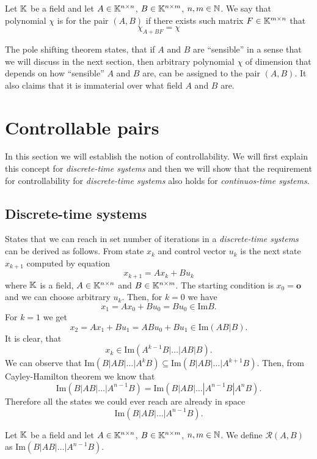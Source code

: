 \begin{definition}
    Let $\mathbb{K}$ be a field and let $A \in \mathbb{K}^{n \times n}$, $B \in \mathbb{K}^{n \times m}$, $n,m \in \mathbb{N}$. We say that polynomial $\chi$ is  for the pair $(A,B)$ if there exists such matrix $F\in\mathbb{K}^{m \times n}$ that $$\chi_{A+BF}=\chi$$
\end{definition}

The pole shifting theorem states, that if $A$ and $B$ are ``sensible'' in a sense that we will discuss in the next section, then arbitrary polynomial $\chi$ of dimension that depends on how ``sensible'' $A$ and $B$ are, can be assigned to the pair $(A,B)$. It also claims that it is immaterial over what field $A$ and $B$ are.

\section{Controllable pairs}

In this section we will establish the notion of controllability. We will first explain this concept for \textit{discrete-time systems} and then we will show that the requirement for controllability for \textit{discrete-time systems} also holds for \textit{continuos-time systems}.

\subsection{Discrete-time systems}

States that we can reach in set number of iterations in a \textit{discrete-time systems} can be derived as follows. From state $x_k$ and control vector $u_k$ is the next state $x_{k+1}$ computed by equation $$x_{k+1}=Ax_k+Bu_k$$ where $\mathbb{K}$ is a field, $A\in\mathbb{K}^{n\times n}$ and $B\in\mathbb{K}^{n\times m}$. The starting condition is $x_0=\textbf{o}$ and we can choose arbitrary $u_k$. Then, for $k=0$ we have $$x_1=Ax_0+Bu_0=Bu_0 \in \text{Im}B.$$ For $k=1$ we get $$x_2=Ax_1+Bu_1=ABu_0+Bu_1\in\text{Im}(AB|B).$$ It is clear, that $$x_k\in\text{Im}(A^{k-1}B|\ldots|AB|B).$$ We can observe that $\text{Im}(B|AB|\ldots|A^kB) \subseteq \text{Im}(B|AB|\ldots|A^{k+1}B)$. Then, from Cayley-Hamilton theorem we know that $$\text{Im}(B|AB|\ldots|A^{n-1}B)=\text{Im}(B|AB|\ldots|A^{n-1}B|A^nB).$$ Therefore all the states we could ever reach are already in space $$\text{Im}(B|AB|\ldots|A^{n-1}B).$$

\begin{definition}
	Let $\mathbb{K}$ be a field and let $A \in \mathbb{K}^{n \times n}$, $B \in \mathbb{K}^{n \times m}$, $n,m \in \mathbb{N}$. We define  $\mathcal{R}(A,B)$ as $\text{Im}(B|AB|\ldots|A^{n-1}B)$.
\end{definition}

